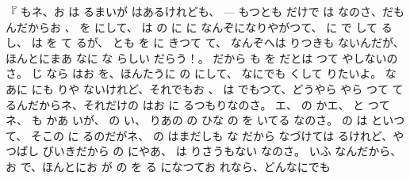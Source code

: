 『
もネ、お
は
るまいが
はあるけれども、 --- もつとも
だけで
は
なのさ、だもんだからお
、
を
にして、
は
の
に
に
なんぞになりやがつて、
に
で
して
るし、
は
を
て
るが、
とも
を
に
きつて
て、
なんぞへは
りつきも
ないんだが、ほんとにまあ
なに
な
らしい
だらう！。
だから
も
を
だとは
つて
やしないのさ。
じ
なら
はお
を、ほんたうに
の
にして、
なにでも
くして
りたいよ。
なあに
にも
りや
ないけれど、それでもお
、
は
でもつて、どうやら
やら
つて
て
るんだからネ、それだけの
はお
に
るつもりなのさ。
エ、
の
かエ、
と
つてネ、
も
かあ
いが、
の
い、
りあの
の
ひな
の
を
いてる
なのさ。
の
は
といつて、
そこの
に
るのだがネ、
の
はまだしも
な
だから
なづけては
るけれど、やつぱし
びいきだから
の
にやあ、
は
りさうもない
なのさ。
いふ
なんだから、お
で、ほんとにお
が
の
を
る
になつてお
れなら、どんなにでも
